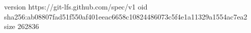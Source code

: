 version https://git-lfs.github.com/spec/v1
oid sha256:ab08807fad51f550af401eeac6658c10824486073c5f4e1a11329a1554ac7ea2
size 262836

